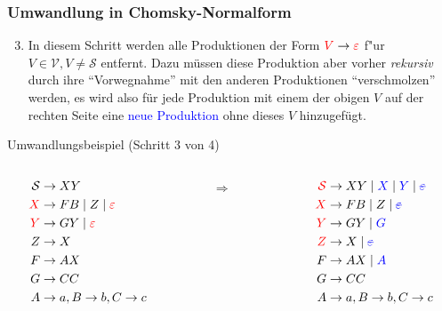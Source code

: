 \begin{frame}
\frametitle{Umwandlung in Chomsky-Normalform}
\begin{enumerate}
\setcounter{enumi}{2}
\item %
In diesem Schritt werden alle Produktionen der Form $\textcolor{red}{V} \rightarrow \textcolor{red}{\varepsilon}$
f"ur $V \in \mathcal{V}, V \not= \mathcal{S}$ entfernt. Dazu müssen diese Produktion aber
vorher \emph{rekursiv} durch ihre "`Vorwegnahme"' mit den anderen Produktionen
"`verschmolzen"' werden, es wird also für jede Produktion mit einem der obigen $V$
auf der rechten Seite eine \textcolor{blue}{neue Produktion} ohne dieses $V$ hinzugefügt.
\end{enumerate}

\begin{exampleblock}{Umwandlungsbeispiel (Schritt 3 von 4)}
\ducttape{-0.25cm}
\begin{columns}[c]
\begin{column}{0.3\textwidth}
\begin{align*}
\mathcal{S} &\rightarrow XY\\
\textcolor{red}{X} &\rightarrow FB \mid Z \mid \textcolor{red}{\varepsilon}\\
\textcolor{red}{Y} &\rightarrow GY \mid \textcolor{red}{\varepsilon}\\
Z &\rightarrow X\\
F &\rightarrow AX\\
G &\rightarrow CC\\
A &\rightarrow a, B \rightarrow b, C \rightarrow c\\
\end{align*}
\end{column}
%
\
\begin{column}{0.05\textwidth}
$\Rightarrow$
\end{column}
%
\begin{column}{0.3\textwidth}
\begin{align*}
\textcolor{red}{\mathcal{S}} &\rightarrow XY \mid \textcolor{blue}{X} \mid  \textcolor{blue}{Y} \mid \textcolor{blue}{\msout{\varepsilon}}\\
\textcolor{red}{X} &\rightarrow FB \mid Z \mid \textcolor{blue}{\msout{\varepsilon}}\\
\textcolor{red}{Y} &\rightarrow GY \mid \textcolor{blue}{G}\\
\textcolor{red}{Z} &\rightarrow X\mid \textcolor{blue}{\msout{\varepsilon}}\\
F &\rightarrow AX \mid \textcolor{blue}{A}\\
G &\rightarrow CC\\
A &\rightarrow a, B \rightarrow b, C \rightarrow c\\
\end{align*}
\end{column}
\end{columns}
\end{exampleblock}
\end{frame}



